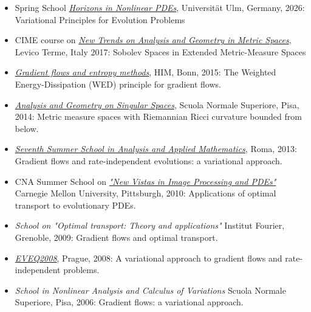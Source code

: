 \documentclass[reqno,11pt]{article}
\theoremstyle{plain}
\begin{document}
\begin{itemize}[topsep=-0.5\parsep,itemsep=-4pt,leftmargin=*] 
  \renewcommand{\labelitemi}{--}

\item Spring School
\href{https://www.uni-ulm.de/mawi/iaa/forschung/spring-school-2026-horizons-in-nonlinear-pdes/}{\emph{Horizons in Nonlinear PDEs}},
  Universit\"at Ulm, Germany, 2026:
  Variational Principles for Evolution Problems

\item CIME course on
\href{https://link.springer.com/book/10.1007/978-3-030-84141-6}{\emph{New Trends on Analysis and Geometry in
    Metric Spaces}},
  Levico Terme, Italy 2017:
  Sobolev Spaces in Extended Metric-Measure Spaces
  
\item
\href{https://www.him.uni-bonn.de/programs/past-programs/past-junior-trimester-programs/optimal-transportation/workshop-gradient-flows-and-entropy-methods/}{\emph{Gradient flows and entropy methods}}, HIM, Bonn, 2015:
The Weighted Energy-Dissipation (WED) principle for gradient flows.


\item 
\href{https://cvgmt.sns.it/event/270/}{\emph{Analysis and Geometry on Singular Spaces}},
Scuola Normale Superiore, Pisa, 2014:
Metric measure spaces with Riemannian Ricci curvature bounded from below.

\item
\href{https://www1.mat.uniroma1.it/people/garroni/School2013.html}{\emph{Seventh Summer School in Analysis and Applied Mathematics}},
Roma, 2013: Gradient flows and rate-independent evolutions: a variational approach.

 \item
CNA Summer School on
\href{https://www.math.cmu.edu/cna/2010CNASummerSchoolFiles/index.html}{\emph{ "New Vistas in Image Processing and PDEs"}}
Carnegie Mellon University, Pittsburgh, 2010:
Applications of optimal transport to evolutionary PDEs.

\item 
 \emph{School on "Optimal transport: Theory and applications"}
 Institut Fourier, Grenoble, 2009: Gradient flows and optimal transport.

 \item 
 \href{https://www2.karlin.mff.cuni.cz/~prusv/ncmm/conference/eveq2008/info.html}{\emph{EVEQ2008}},
 Prague, 2008: A variational approach to gradient flows and rate-independent problems.

 \item 
 \emph{School in Nonlinear Analysis and Calculus of Variations}
 Scuola Normale Superiore, Pisa, 2006:
 Gradient flows: a variational approach.
\end{itemize}
\end{document}
